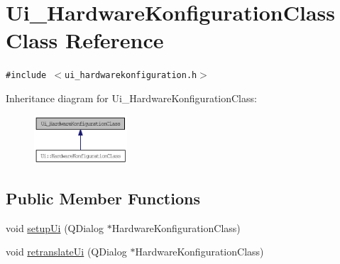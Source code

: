 \hypertarget{class_ui___hardware_konfiguration_class}{
\section{Ui\_\-HardwareKonfigurationClass Class Reference}
\label{class_ui___hardware_konfiguration_class}
}
{\tt \#include $<$ui\_\-hardwarekonfiguration.h$>$}

Inheritance diagram for Ui\_\-HardwareKonfigurationClass:\nopagebreak
\begin{figure}[H]
\begin{center}
\leavevmode
\includegraphics[width=98pt]{class_ui___hardware_konfiguration_class__inherit__graph}
\end{center}
\end{figure}
\subsection*{Public Member Functions}
\begin{CompactItemize}
\item 
void \hyperlink{class_ui___hardware_konfiguration_class_4c1da234ff2e595c09d91bc7163e9473}{setupUi} (QDialog $\ast$HardwareKonfigurationClass)
\item 
void \hyperlink{class_ui___hardware_konfiguration_class_0e48e8e80382f195341a76922ff926b1}{retranslateUi} (QDialog $\ast$HardwareKonfigurationClass)
\end{CompactItemize}
